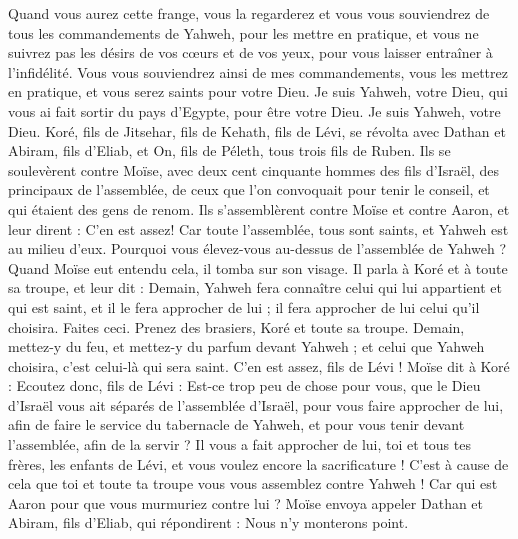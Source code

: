 \begin{multicols}{2}
Quand vous aurez cette frange, vous la regarderez et vous vous souviendrez de tous les commandements de Yahweh, pour les mettre en pratique, et vous ne suivrez pas les désirs de vos cœurs et de vos yeux, pour vous laisser entraîner à l'infidélité.
Vous vous souviendrez ainsi de mes commandements, vous les mettrez en pratique, et vous serez saints pour votre Dieu.
Je suis Yahweh, votre Dieu, qui vous ai fait sortir du pays d'Egypte, pour être votre Dieu. Je suis Yahweh, votre Dieu.
\VerseOne{}Koré, fils de Jitsehar, fils de Kehath, fils de Lévi, se révolta avec Dathan et Abiram, fils d'Eliab, et On, fils de Péleth, tous trois fils de Ruben.
Ils se soulevèrent contre Moïse, avec deux cent cinquante hommes des fils d'Israël, des principaux de l'assemblée, de ceux que l'on convoquait pour tenir le conseil, et qui étaient des gens de renom.
Ils s'assemblèrent contre Moïse et contre Aaron, et leur dirent : C'en est assez! Car toute l'assemblée, tous sont saints, et Yahweh est au milieu d'eux. Pourquoi vous élevez-vous au-dessus de l'assemblée de Yahweh ?
Quand Moïse eut entendu cela, il tomba sur son visage.
Il parla à Koré et à toute sa troupe, et leur dit : Demain, Yahweh fera connaître celui qui lui appartient et qui est saint, et il le fera approcher de lui ; il fera approcher de lui celui qu'il choisira.
Faites ceci. Prenez des brasiers, Koré et toute sa troupe.
Demain, mettez-y du feu, et mettez-y du parfum devant Yahweh ; et celui que Yahweh choisira, c'est celui-là qui sera saint. C'en est assez, fils de Lévi !
Moïse dit à Koré : Ecoutez donc, fils de Lévi :
Est-ce trop peu de chose pour vous, que le Dieu d'Israël vous ait séparés de l'assemblée d'Israël, pour vous faire approcher de lui, afin de faire le service du tabernacle de Yahweh, et pour vous tenir devant l'assemblée, afin de la servir ?
Il vous a fait approcher de lui, toi et tous tes frères, les enfants de Lévi, et vous voulez encore la sacrificature !
C'est à cause de cela que toi et toute ta troupe vous vous assemblez contre Yahweh ! Car qui est Aaron pour que vous murmuriez contre lui ?
Moïse envoya appeler Dathan et Abiram, fils d'Eliab, qui répondirent : Nous n'y monterons point.

\end{multicols}
